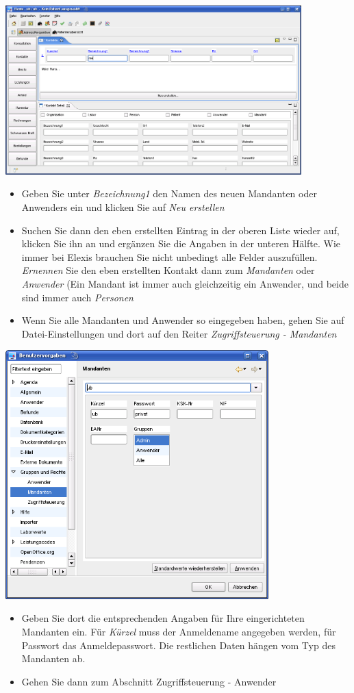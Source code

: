 \includegraphics[width=4.5in]{images/grundkonfkonta.png}
\begin{itemize}
 \item Geben Sie unter \textit{Bezeichnung1} den Namen des neuen Mandanten oder Anwenders ein und klicken Sie auf \textit{Neu erstellen}
 \item Suchen Sie dann den eben erstellten Eintrag in der oberen Liste wieder auf, klicken Sie ihn an und ergänzen Sie die Angaben in der unteren Hälfte. Wie immer bei Elexis brauchen Sie nicht unbedingt alle Felder auszufüllen. \textit{Ernennen} Sie den eben erstellten Kontakt dann zum \textit{Mandanten} oder \textit{Anwender} (Ein Mandant ist immer auch gleichzeitig ein Anwender, und beide sind immer auch \textit{Personen}
 \item Wenn Sie alle Mandanten und Anwender so eingegeben haben, gehen Sie auf Datei-Einstellungen und dort auf den Reiter \textit{Zugriffsteuerung - Mandanten}
\end{itemize}

\includegraphics[width=4in]{images/grundkonfmand.png}
\begin{itemize}
 \item Geben Sie dort die entsprechenden Angaben für Ihre eingerichteten Mandanten ein. Für \textit{Kürzel} muss der Anmeldename angegeben werden, für Passwort das Anmeldepasswort. Die restlichen Daten hängen vom Typ des Mandanten ab.
 \item Gehen Sie dann zum Abschnitt Zugriffsteuerung - Anwender
\end{itemize}

